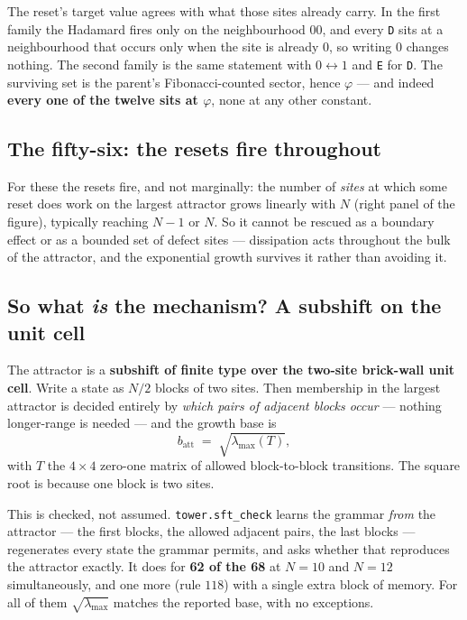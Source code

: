 \documentclass[11pt]{article}
\newcommand{\rt}[1]{\texttt{#1}}
\newcommand{\fn}[1]{\texttt{#1}}
\newcommand{\att}{\mathrm{att}}
\begin{document}
\noindent The reset's target value agrees with what those sites already carry.
In the first family the Hadamard fires only on the neighbourhood $00$, and every
\rt{D} sits at a neighbourhood that occurs only when the site is already $0$, so
writing $0$ changes nothing. The second family is the same statement with
$0\leftrightarrow1$ and \rt{E} for \rt{D}. The surviving set is the parent's
Fibonacci-counted sector, hence $\varphi$ --- and indeed \textbf{every one of the
twelve sits at $\varphi$}, none at any other constant.

\subsection{The fifty-six: the resets fire throughout}

For these the resets fire, and not marginally: the number of \emph{sites} at
which some reset does work on the largest attractor grows linearly with $N$
(right panel of the figure), typically reaching $N-1$ or $N$. So it cannot be
rescued as a boundary effect or as a bounded set of defect sites --- dissipation
acts throughout the bulk of the attractor, and the exponential growth survives
it rather than avoiding it.

\subsection{So what \emph{is} the mechanism? A subshift on the unit cell}
\label{sec:sft}

The attractor is a \textbf{subshift of finite type over the two-site brick-wall
unit cell}. Write a state as $N/2$ blocks of two sites. Then membership in the
largest attractor is decided entirely by \emph{which pairs of adjacent blocks
occur} --- nothing longer-range is needed --- and the growth base is
\[
b_\att \;=\; \sqrt{\lambda_{\max}(T)},
\]
with $T$ the $4\times4$ zero-one matrix of allowed block-to-block transitions.
The square root is because one block is two sites.

This is checked, not assumed. \fn{tower.sft\_check} learns the grammar
\emph{from} the attractor --- the first blocks, the allowed adjacent pairs, the
last blocks --- regenerates every state the grammar permits, and asks whether
that reproduces the attractor exactly. It does for \textbf{62 of the 68} at
$N=10$ and $N=12$ simultaneously, and one more (rule $118$) with a single extra
block of memory. For all of them $\sqrt{\lambda_{\max}}$ matches the reported
base, with no exceptions.
\end{document}
